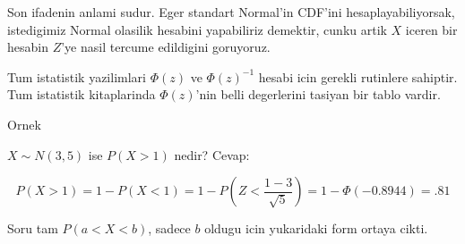 \documentclass[12pt,fleqn]{article}\usepackage{../common}
\begin{document}
Son ifadenin anlami sudur. Eger standart Normal'in CDF'ini
hesaplayabiliyorsak, istedigimiz Normal olasilik hesabini yapabiliriz
demektir, cunku artik $X$ iceren bir hesabin $Z$'ye nasil tercume
edildigini goruyoruz. 

Tum istatistik yazilimlari $\Phi(z)$ ve $\Phi(z)^{-1}$ hesabi icin gerekli
rutinlere sahiptir. Tum istatistik kitaplarinda $\Phi(z)$'nin belli
degerlerini tasiyan bir tablo vardir.

Ornek 

$X \sim N(3,5)$ ise $P(X > 1)$ nedir? Cevap:

\[ P(X>1) = 1 - P(X < 1) = 1 - P( Z < \frac{ 1 - 3}{\sqrt{5 }}) = 
1 - \Phi(-0.8944) = .81
 \]

Soru tam $P(a  < X < b)$, sadece $b$ oldugu icin yukaridaki form ortaya
cikti. 
\end{document}
